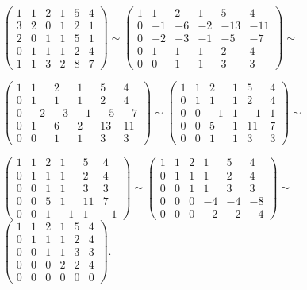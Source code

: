 \documentclass[12pt]{article}
\newenvironment{solutions}[2][Solutions]
{\begin{trivlist}\item[{\bfseries #1} {\bfseries #2.}]}{\end{trivlist}}
\begin{document}
\begin{solutions}{3}
$\begin{pmatrix}
1 & 1 & 2 & 1 & 5 & 4\\
3 & 2 & 0 & 1 & 2 & 1\\
2 & 0 & 1 & 1 & 5 & 1\\
0 & 1 & 1 & 1 & 2 & 4\\
1 & 1 & 3 & 2 & 8 & 7
\end{pmatrix}\sim
\begin{pmatrix}
1 & 1 & 2 & 1 & 5 & 4\\
0 & -1 & -6 & -2 & -13 & -11\\
0 & -2 & -3 & -1 & -5 & -7\\
0 & 1 & 1 & 1 & 2 & 4\\
0 & 0 & 1 & 1 & 3 & 3
\end{pmatrix}\sim$

$\begin{pmatrix}
1 & 1 & 2 & 1 & 5 & 4\\
0 & 1 & 1 & 1 & 2 & 4\\
0 & -2 & -3 & -1 & -5 & -7\\
0 & 1 & 6 & 2 & 13 & 11\\
0 & 0 & 1 & 1 & 3 & 3
\end{pmatrix}\sim
\begin{pmatrix}
1 & 1 & 2 & 1 & 5 & 4\\
0 & 1 & 1 & 1 & 2 & 4\\
0 & 0 & -1 & 1 & -1 & 1\\
0 & 0 & 5 & 1 & 11 & 7\\
0 & 0 & 1 & 1 & 3 & 3
\end{pmatrix}\sim$

$\begin{pmatrix}
1 & 1 & 2 & 1 & 5 & 4\\
0 & 1 & 1 & 1 & 2 & 4\\
0 & 0 & 1 & 1 & 3 & 3\\
0 & 0 & 5 & 1 & 11 & 7\\
0 & 0 & 1 & -1 & 1 & -1
\end{pmatrix}\sim
\begin{pmatrix}
1 & 1 & 2 & 1 & 5 & 4\\
0 & 1 & 1 & 1 & 2 & 4\\
0 & 0 & 1 & 1 & 3 & 3\\
0 & 0 & 0 & -4 & -4 & -8\\
0 & 0 & 0 & -2 & -2 & -4
\end{pmatrix}\sim$
$\begin{pmatrix}
1 & 1 & 2 & 1 & 5 & 4\\
0 & 1 & 1 & 1 & 2 & 4\\
0 & 0 & 1 & 1 & 3 & 3\\
0 & 0 & 0 & 2 & 2 & 4\\
0 & 0 & 0 & 0 & 0 & 0
\end{pmatrix}$. 


\end{solutions}
\end{document}
